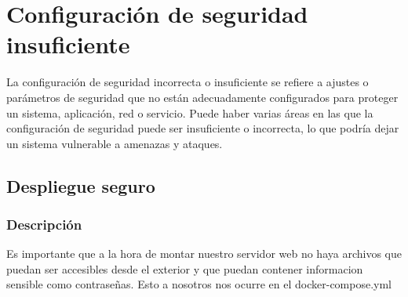 \documentclass{report}
\begin{document}
        \section{Configuración de seguridad insuficiente}
            La configuración de seguridad incorrecta o insuficiente se refiere a ajustes o parámetros de seguridad que no están adecuadamente configurados para proteger un sistema, aplicación, red o servicio. Puede haber varias áreas en las que la configuración de seguridad puede ser insuficiente o incorrecta, lo que podría dejar un sistema vulnerable a amenazas y ataques.
            \subsection{Despliegue seguro}
                \subsubsection{Descripción}
                    Es importante que a la hora de montar nuestro servidor web no haya archivos que puedan ser accesibles desde el exterior y que puedan contener informacion sensible como contraseñas. Esto a nosotros nos ocurre en el docker-compose.yml
\end{document}
